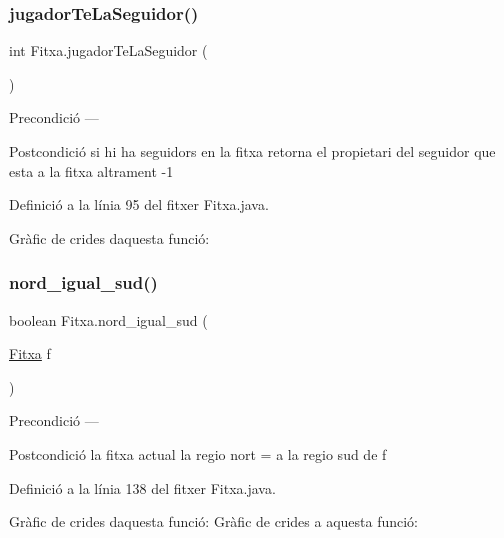 \subsubsection{\texorpdfstring{jugador\+Te\+La\+Seguidor()}{jugadorTeLaSeguidor()}}
{\footnotesize\ttfamily int Fitxa.\+jugador\+Te\+La\+Seguidor (\begin{DoxyParamCaption}{ }\end{DoxyParamCaption})}

\begin{DoxyPrecond}{Precondició}
--- 
\end{DoxyPrecond}
\begin{DoxyPostcond}{Postcondició}
si hi ha seguidors en la fitxa retorna el propietari del seguidor que esta a la fitxa altrament -\/1 
\end{DoxyPostcond}


Definició a la línia 95 del fitxer Fitxa.\+java.

Gràfic de crides d\textquotesingle{}aquesta funció\+:
\mbox{\label{class_fitxa_adf25d9e83a70a03961408b87f01cfdad}} 
\subsubsection{\texorpdfstring{nord\+\_\+igual\+\_\+sud()}{nord\_igual\_sud()}}
{\footnotesize\ttfamily boolean Fitxa.\+nord\+\_\+igual\+\_\+sud (\begin{DoxyParamCaption}\item[{\mbox{\hyperlink{class_fitxa}{Fitxa}}}]{f }\end{DoxyParamCaption})}

\begin{DoxyPrecond}{Precondició}
--- 
\end{DoxyPrecond}
\begin{DoxyPostcond}{Postcondició}
la fitxa actual la regio nort = a la regio sud de f 
\end{DoxyPostcond}


Definició a la línia 138 del fitxer Fitxa.\+java.

Gràfic de crides d\textquotesingle{}aquesta funció\+:
Gràfic de crides a aquesta funció\+:
\mbox{\label{class_fitxa_ac5a6f1b4d54afc479b60f24a8e0d6839}} 
